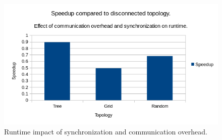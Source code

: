 \begin{figure}
    \centering
    \includegraphics[width=\textwidth,height=\textheight,keepaspectratio]{figures/usecasespeedup.png}
    \caption{Runtime impact of synchronization and communication overhead.}
    \label{fig:usecasespeedup}
\end{figure}

